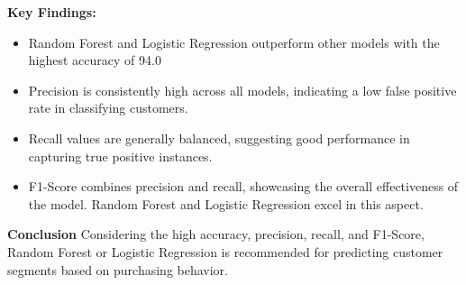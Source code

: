 \textbf{Key Findings:}
\begin{itemize}
\item Random Forest and Logistic Regression outperform other models with the highest accuracy of 94.0%
\item Precision is consistently high across all models, indicating a low false positive rate in classifying customers.
\item Recall values are generally balanced, suggesting good performance in capturing true positive instances.
\item F1-Score combines precision and recall, showcasing the overall effectiveness of the model. Random Forest and Logistic Regression excel in this aspect.
\end{itemize}

\textbf{Conclusion}
Considering the high accuracy, precision, recall, and F1-Score, Random Forest or Logistic Regression is recommended for predicting customer segments based on purchasing behavior.




